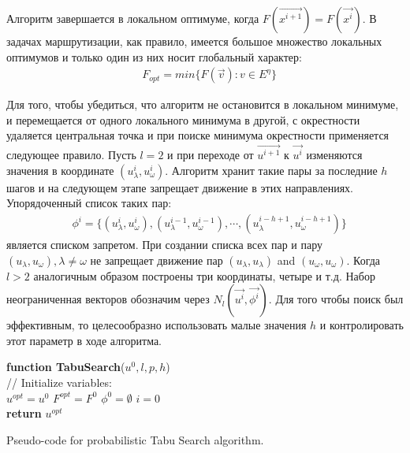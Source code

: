 \documentclass[]{TAACpaper}
\begin{document}
Алгоритм завершается в локальном оптимуме, когда $F(\vec{x^{i+1}})=F(\vec{x^i})$. В задачах маршрутизации, как правило, имеется большое множество локальных оптимумов и только один из них носит глобальный характер:
\begin{align} 
& F_{opt}=min\{F(\vec{v}):v \in E^{\eta}\}
\end{align}	

Для того, чтобы убедиться, что алгоритм не остановится в локальном минимуме, и перемещается от одного локального минимума в другой, с окрестности удаляется центральная точка и при поиске минимума окрестности применяется следующее правило. Пусть $l=2$ и при переходе от $\vec{u^{i+1}}$ к $\vec{u^i}$ изменяются значения в координате $(u_\lambda^{i}, u_\omega^{i})$. Алгоритм хранит такие пары за последние $h$ шагов и на следующем этапе запрещает движение в этих направлениях. Упорядоченный список таких пар:
\begin{align} 
& \phi^i=\{(u_\lambda^{i},u_\omega^{i}),(u_\lambda^{i-1},u_\omega^{i-1}),\cdots,(u_\lambda^{i-h+1},u_\omega^{i-h+1}) \} 
\end{align}	
является списком запретом. При создании списка всех пар  и пару $(u_\lambda,u_\omega),\lambda \ne \omega$ не запрещает движение пар $(u_\lambda,u_\lambda)$ and $(u_\omega,u_\omega)$. Когда $l>2$ аналогичным образом построены три координаты, четыре и т.д. Набор неограниченная векторов обозначим через $N_l(\vec{u^i},\vec{\phi^i})$. Для того чтобы поиск был эффективным, то целесообразно использовать малые значения  $h$ и контролировать этот параметр в ходе алгоритма.

\begin{algorithm}[H]
	\textbf{function TabuSearch}($u^0,l,p,h$) \\
	// Initialize variables:	\\
	$u^{opt} = u^0$
	$F^{opt} = F^0$
	$\phi^{0} =  \emptyset$
	$i=0$ \\
	\textbf{return} $u^{opt}$
	
\caption{Pseudo-code for probabilistic Tabu Search algorithm.}
\label{alg:TabuSearch}
\end{algorithm}
\end{document}

